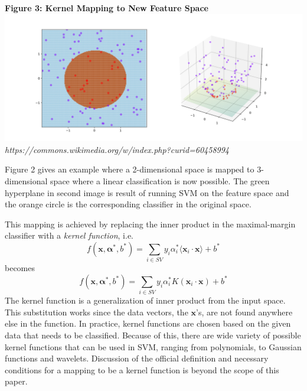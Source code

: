 \documentclass{article}
\newcommand{\balpha}{\bm{\alpha}}
\begin{document}
\begin{samepage}
\begin{center}

\textbf{Figure 3: Kernel Mapping to New Feature Space}
\includegraphics[scale=0.30]{kerneltrick}
\nopagebreak
\textit{https://commons.wikimedia.org/w/index.php?curid=60458994}
\end{center}
\end{samepage}

Figure 2 gives an example where a 2-dimensional space is mapped to 3-dimensional space where a linear classification is now possible. The green hyperplane in second image is result of running SVM on the feature space and the orange circle is the corresponding classifier in the original space.

This mapping is achieved by replacing the inner product in the maximal-margin classifier with a \textit{kernel function}, i.e.
$$ f(\mathbf{x}, \balpha^*, b^*) = \sum_{i \in SV} y_i \alpha_i^* \langle \mathbf{x}_i \cdot \mathbf{x} \rangle + b^*$$
becomes
$$ f(\mathbf{x}, \balpha^*, b^*) = \sum_{i \in SV} y_i \alpha_i^* K(\mathbf{x}_i \cdot \mathbf{x}) + b^*$$
The kernel function is a generalization of inner product from the input space. This substitution works since the data vectors, the $\mathbf{x}$'s, are not found anywhere else in the function. In practice, kernel functions are chosen based on the given data that needs to be classified. Because of this, there are wide variety of possible kernel functions that can be used in SVM, ranging from polynomials, to Gaussian functions and wavelets. Discussion of the official definition and necessary conditions for a mapping to be  a kernel function is beyond the scope of this paper. 
\end{document}
